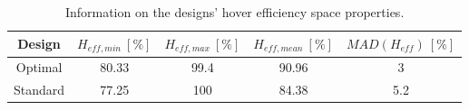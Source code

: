 \begin{table}[!ht]
\begin{center}
 \caption{Information on the designs’ hover efficiency space properties.}\vspace{1ex}
 \label{tab:tab_Penta_compare_hover}
  {\scriptsize\begin{tabular}{|c|cccc|}
 \hline
  Design & $H_{eff,min}\ [\%]$ & $H_{eff,max}\ [\%]$ & $H_{eff,mean}\ [\%]$
  & $MAD(H_{eff})\ [\%]$\\ \hline
  Optimal & 80.33 & 99.4 & 90.96 & 3\\
  Standard & 77.25 & 100 & 84.38 & 5.2\\
 \hline
\end{tabular}}
\end{center}
\end{table}


